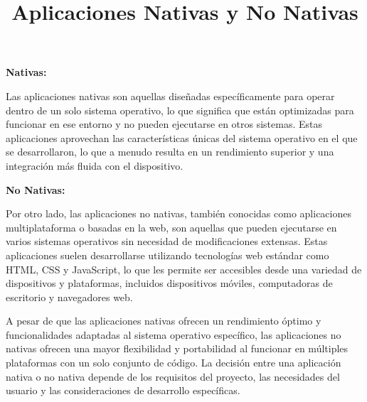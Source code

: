 \documentclass{article}
\title{Aplicaciones Nativas y No Nativas}
\author{}
\date{}
\begin{document}
\maketitle

\textbf{Nativas:}

Las aplicaciones nativas son aquellas diseñadas específicamente para operar dentro de un solo sistema operativo, lo que significa que están optimizadas para funcionar en ese entorno y no pueden ejecutarse en otros sistemas. Estas aplicaciones aprovechan las características únicas del sistema operativo en el que se desarrollaron, lo que a menudo resulta en un rendimiento superior y una integración más fluida con el dispositivo.

\textbf{No Nativas:}

Por otro lado, las aplicaciones no nativas, también conocidas como aplicaciones multiplataforma o basadas en la web, son aquellas que pueden ejecutarse en varios sistemas operativos sin necesidad de modificaciones extensas. Estas aplicaciones suelen desarrollarse utilizando tecnologías web estándar como HTML, CSS y JavaScript, lo que les permite ser accesibles desde una variedad de dispositivos y plataformas, incluidos dispositivos móviles, computadoras de escritorio y navegadores web.

A pesar de que las aplicaciones nativas ofrecen un rendimiento óptimo y funcionalidades adaptadas al sistema operativo específico, las aplicaciones no nativas ofrecen una mayor flexibilidad y portabilidad al funcionar en múltiples plataformas con un solo conjunto de código. La decisión entre una aplicación nativa o no nativa depende de los requisitos del proyecto, las necesidades del usuario y las consideraciones de desarrollo específicas.
\end{document}
